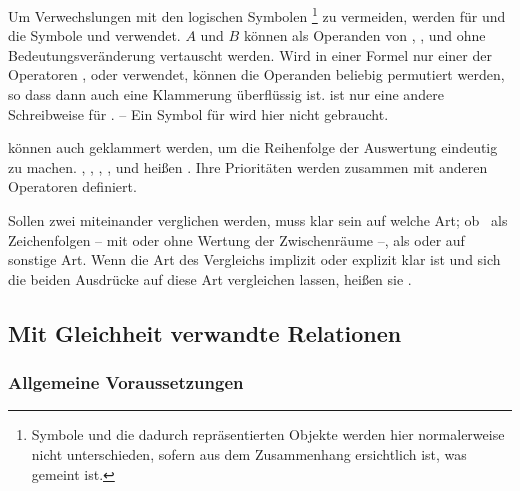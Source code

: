 Um Verwechslungen mit den logischen Symbolen%
\footnote{%
	Symbole und die dadurch repräsentierten Objekte werden hier normalerweise nicht unterschieden, sofern aus dem Zusammenhang ersichtlich ist, was gemeint ist.%
}
zu vermeiden, werden für  und  die Symbole \symqt{$\metaand$} und \symqt{$\metaor$} verwendet.
$A$ und $B$ können als Operanden von \symqt{$\metaequiv$}, \symqt{$\metaand$}, \symqt{$\metaor$} und \symqt{$\srand$} ohne Bedeutungsveränderung vertauscht werden.
Wird in einer Formel nur einer der Operatoren \symqt{$\metaand$}, \symqt{$\metaor$} oder \symqt{$\srand$} verwendet, können die Operanden beliebig permutiert werden, so dass dann auch eine Klammerung überflüssig ist.
 ist nur eine andere Schreibweise für .
-- Ein Symbol für  wird hier nicht gebraucht.

 können auch geklammert werden, um die Reihenfolge der Auswertung eindeutig zu machen.
\symqt{$\metaimp$}, \symqt{$\metarep$}, \symqt{$\metaequiv$}, \symqt{$\metaand$}, \symqt{$\metaor$} und \symqt{$\srand$} heißen \emph{}.
Ihre Prioritäten werden  zusammen mit anderen Operatoren definiert.

Sollen zwei  miteinander verglichen werden, muss klar sein auf welche Art; ob \textzB\ als Zeichenfolgen -- mit oder ohne Wertung der Zwischenräume --, als  oder auf sonstige Art.
Wenn die Art des Vergleichs implizit oder explizit klar ist und sich die beiden Ausdrücke auf diese Art vergleichen lassen, heißen sie \emph{}.

\subsection{Mit Gleichheit verwandte Relationen}%
\label{sub:Gleichheit}

\subsubsection{Allgemeine Voraussetzungen}
\label{subsub:Voraussetzungen}

